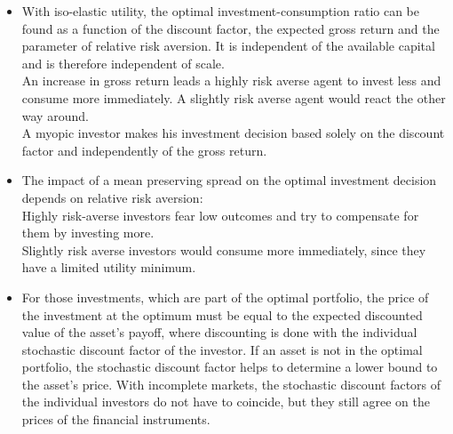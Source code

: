 \begin{itemize}
    \item With iso-elastic utility, the optimal investment-consumption ratio can be found as a function of the discount factor, the expected gross return and the parameter of relative risk aversion. It is independent of the available capital and is therefore independent of scale.\\
    An increase in gross return leads a highly risk averse agent to invest less and consume more immediately. A slightly risk averse agent would react the other way around.\\
    A myopic investor makes his investment decision based solely on the discount factor and independently of the gross return.\\
    
    \item The impact of a mean preserving spread on the optimal investment decision depends on relative risk aversion: \\
    Highly risk-averse investors fear low outcomes and try to compensate for them by investing more.\\
    Slightly risk averse investors would consume more immediately, since they have a limited utility minimum.\\
    
    \item For those investments, which are part of the optimal portfolio, the price of the investment at the optimum must be equal to the expected discounted value of the asset's payoff, where discounting is done with the individual stochastic discount factor of the investor. If an asset is not in the optimal portfolio, the stochastic discount factor helps to determine a lower bound to the asset's price. With incomplete markets, the stochastic discount factors of the individual investors do not have to coincide, but they still agree on the prices of the financial instruments.
\end{itemize}
